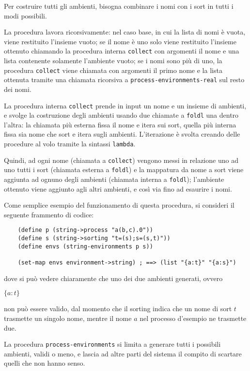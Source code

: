 Per costruire tutti gli ambienti, bisogna combinare i nomi con i sort
in tutti i modi possibili.

La procedura lavora ricorsivamente: nel caso base, in cui la lista di
nomi \`e vuota, viene restituito l'insieme vuoto; se il nome \`e uno solo
viene restituito l'insieme ottenuto chiamando la procedura interna
\lstinline{collect} con argomenti il nome e una lista contenente
solamente l'ambiente vuoto; se i nomi sono pi\`u di uno, la procedura
\lstinline{collect} viene chiamata con argomenti il primo nome e la
lista ottenuta tramite una chiamata ricorsiva a
\lstinline{process-environments-real} sul resto dei nomi.

La procedura interna \lstinline{collect} prende in input un nome e un
insieme di ambienti, e svolge la costruzione degli ambienti usando due
chiamate a \lstinline{foldl} una dentro l'altra: la chiamata pi\`u
esterna fissa il nome e itera sui sort, quella pi\`u interna fissa sia
nome che sort e itera sugli ambienti. L'iterazione \`e svolta creando
delle procedure al volo tramite la sintassi \lstinline{lambda}.

Quindi, ad ogni nome (chiamata a \lstinline{collect}) vengono messi in
relazione uno ad uno tutti i sort (chiamata esterna a \lstinline{foldl})
e la mappatura da nome a sort viene aggiunta ad ognuno degli ambienti
(chiamata interna a \lstinline{foldl}); l'ambiente ottenuto viene
aggiunto agli altri ambienti, e cos\`i via fino ad esaurire i nomi.

Come semplice esempio del funzionamento di questa procedura, si
consideri il seguente frammento di codice:

\begin{lstlisting}
    (define p (string->process "a(b,c).0"))
    (define s (string->sorting "t=(s);s=(s,t)"))
    (define envs (string-environments p s))

    (set-map envs environment->string) ; ==> (list "{a:t}" "{a:s}")
\end{lstlisting}

dove si pu\`o vedere chiaramente che uno dei due ambienti generati,
ovvero

\begin{pilisting}
$
    \{a:t\}
$
\end{pilisting}

non pu\`o essere valido, dal momento che il sorting indica che un nome
di sort $t$ trasmette un singolo nome, mentre il nome $a$ nel processo
d'esempio ne trasmette due.

La procedura \lstinline{process-environments} si limita a generare tutti
i possibili ambienti, validi o meno, e lascia ad altre parti del sistema
il compito di scartare quelli che non hanno senso.

